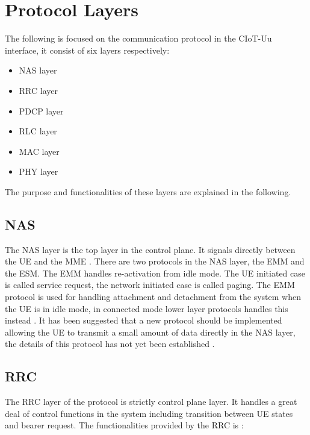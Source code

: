 \section{Protocol Layers}

The following is focused on the communication protocol in the \gls{CIoT}-Uu interface, it consist of six layers respectively:
\begin{itemize}
	\item \gls{NAS} layer
	\item \gls{RRC} layer
	\item \gls{PDCP} layer
	\item \gls{RLC} layer
	\item \gls{MAC} layer
	\item \gls{PHY} layer
\end{itemize}

The purpose and functionalities of these layers are explained in the following.

\subsection{NAS}
The \gls{NAS} layer is the top layer in the control plane. It signals directly between the \gls{UE} and the \gls{MME} \citep[ch. 3]{book_LTE_for_UMTS}. There are two protocols in the \gls{NAS} layer, the \gls{EMM} and the \gls{ESM}. The \gls{EMM} handles re-activation from idle mode. The \gls{UE} initiated case is called service request, the network initiated case is called paging. The \gls{EMM} protocol is used for handling attachment and detachment from the system when the \gls{UE} is in idle mode, in connected mode lower layer protocols handles this instead \citep[ch. 3]{book_LTE_for_UMTS}. It has been suggested that a new protocol should be implemented allowing the \gls{UE} to transmit a small amount of data directly in the \gls{NAS} layer, the details of this protocol has not yet been established \citep{REL-13}. 

\subsection{RRC} \label{sec:RRC}
The \gls{RRC} layer of the protocol is strictly control plane layer. It handles a great deal of control functions in the system including transition between \gls{UE} states and bearer request. The functionalities provided by the \gls{RRC} is \citep[ch. 6.6]{book_LTE_for_UMTS}:

